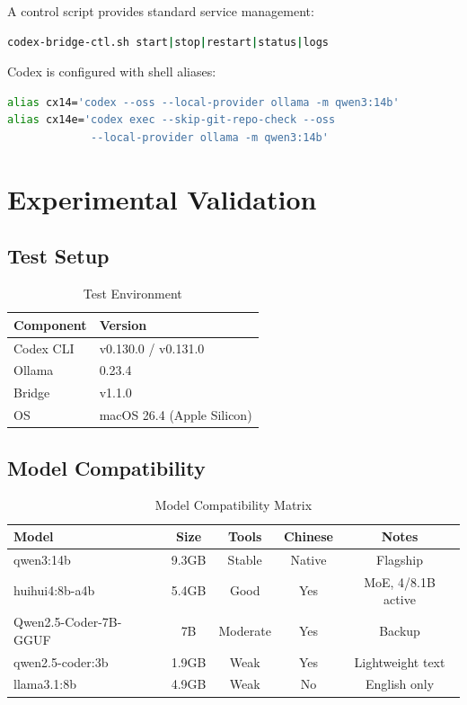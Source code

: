 \documentclass[11pt,a4paper]{article}
\begin{document}
A control script provides standard service management:

\begin{lstlisting}[language=bash]
codex-bridge-ctl.sh start|stop|restart|status|logs
\end{lstlisting}

Codex is configured with shell aliases:

\begin{lstlisting}[language=bash]
alias cx14='codex --oss --local-provider ollama -m qwen3:14b'
alias cx14e='codex exec --skip-git-repo-check --oss
             --local-provider ollama -m qwen3:14b'
\end{lstlisting}

\section{Experimental Validation}

\subsection{Test Setup}

\begin{table}[H]
\centering
\caption{Test Environment}
\label{tab:env}
\begin{tabular}{ll}
\toprule
\textbf{Component} & \textbf{Version} \\
\midrule
Codex CLI  & v0.130.0 / v0.131.0 \\
Ollama     & 0.23.4 \\
Bridge     & v1.1.0 \\
OS         & macOS 26.4 (Apple Silicon) \\
\bottomrule
\end{tabular}
\end{table}

\subsection{Model Compatibility}

\begin{table}[H]
\centering
\caption{Model Compatibility Matrix}
\label{tab:models}
\begin{tabular}{lcccc}
\toprule
\textbf{Model} & \textbf{Size} & \textbf{Tools} & \textbf{Chinese} & \textbf{Notes} \\
\midrule
qwen3:14b              & 9.3GB  & Stable  & Native & Flagship \\
huihui4:8b-a4b         & 5.4GB  & Good    & Yes    & MoE, 4/8.1B active \\
Qwen2.5-Coder-7B-GGUF  & 7B     & Moderate& Yes    & Backup \\
qwen2.5-coder:3b       & 1.9GB  & Weak    & Yes    & Lightweight text \\
llama3.1:8b            & 4.9GB  & Weak    & No     & English only \\
\bottomrule
\end{tabular}
\end{table}
\end{document}
